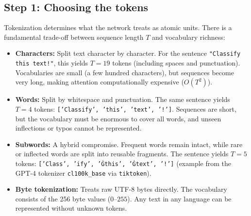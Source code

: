 \documentclass[11pt,a4paper]{article}
\newcommand{\slides}[1]{\par\nopagebreak\noindent{\normalfont\small\emph{(slides #1)}}\par\nopagebreak\vspace{2pt}}
\theoremstyle{definition}
\theoremstyle{plain}
\begin{document}
\subsection{Step 1: Choosing the tokens}\slides{3 / 84}
Tokenization determines what the network treats as atomic units. There is a fundamental trade-off between sequence length $T$ and vocabulary richness:
\begin{itemize}
\item \textbf{Characters:} Split text character by character. For the sentence \texttt{"Classify this text!"}, this yields $T = 19$ tokens (including spaces and punctuation). Vocabularies are small (a few hundred characters), but sequences become very long, making attention computationally expensive ($O(T^2)$).
\item \textbf{Words:} Split by whitespace and punctuation. The same sentence yields $T = 4$ tokens: \texttt{['Classify', 'this', 'text', '!']}. Sequences are short, but the vocabulary must be enormous to cover all words, and unseen inflections or typos cannot be represented.
\item \textbf{Subwords:} A hybrid compromise. Frequent words remain intact, while rare or inflected words are split into reusable fragments. The sentence yields $T = 5$ tokens: \texttt{['Class', 'ify', 'Ġthis', 'Ġtext', '!']} (example from the GPT-4 tokenizer \texttt{cl100k\_base} via \texttt{tiktoken}).
\item \textbf{Byte tokenization:} Treats raw UTF-8 bytes directly. The vocabulary consists of the 256 byte values ($0\text{--}255$). Any text in any language can be represented without unknown tokens.
\end{itemize}
\end{document}
